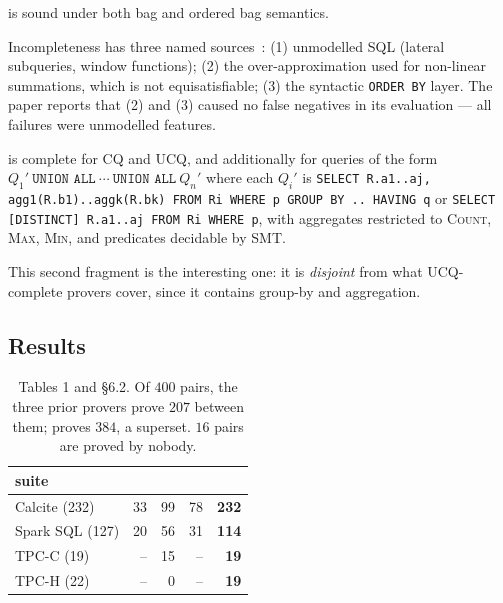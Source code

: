 \begin{theorem}
\sqlsolver{} is sound under both bag and ordered bag semantics.
\end{theorem}

\noindent Incompleteness has three named sources~\cite[\S5]{sqlsolver}:
(1) unmodelled SQL (lateral subqueries, window functions);
(2) the over-approximation used for non-linear summations, which is not equisatisfiable;
(3) the syntactic \lstinline|ORDER BY| layer.
The paper reports that (2) and (3) caused no false negatives in its evaluation --- all
failures were unmodelled features.

\begin{theorem}
\sqlsolver{} is complete for CQ and UCQ, and additionally for queries of the form
$Q_1'\ \texttt{UNION ALL}\ \cdots\ \texttt{UNION ALL}\ Q_n'$ where each $Q_i'$ is
\lstinline|SELECT R.a1..aj, agg1(R.b1)..aggk(R.bk) FROM Ri WHERE p GROUP BY .. HAVING q| or
\lstinline|SELECT [DISTINCT] R.a1..aj FROM Ri WHERE p|, with aggregates restricted to
\textsc{Count}, \textsc{Max}, \textsc{Min}, and predicates decidable by SMT.
\end{theorem}

This second fragment is the interesting one: it is \emph{disjoint} from what UCQ-complete
provers cover, since it contains group-by and aggregation.

\subsection{Results}

\begin{table}[h]\centering\small
\begin{tabular}{@{}lrrrr@{}}
\toprule
suite & \udp{} & \spes{} & \wetune{} & \sqlsolver{}\\
\midrule
Calcite (232)   & 33 & 99 & 78 & \textbf{232}\\
Spark SQL (127) & 20 & 56 & 31 & \textbf{114}\\
TPC-C (19)      & -- & 15 & -- & \textbf{19}\\
TPC-H (22)      & -- & 0  & -- & \textbf{19}\\
\bottomrule
\end{tabular}
\caption{\cite{sqlsolver} Tables 1 and \S6.2. Of $400$ pairs, the three prior provers prove
$207$ between them; \sqlsolver{} proves $384$, a superset. $16$ pairs are proved by nobody.}
\end{table}

